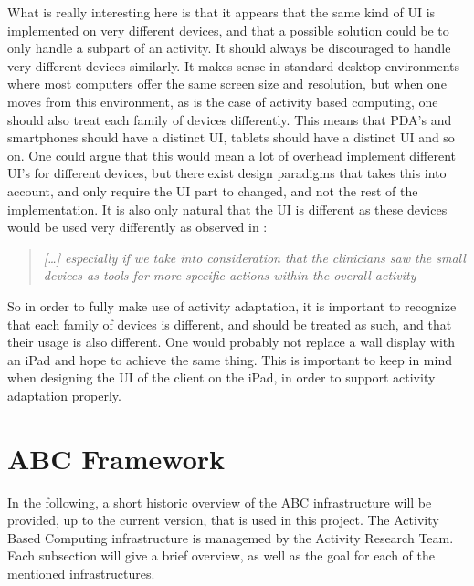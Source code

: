 What is really interesting here is that it appears that the same kind of UI is implemented on very different devices, and that a possible solution could be to only handle a subpart of an activity. It should always be discouraged to handle very different devices similarly. It makes sense in standard desktop environments where most computers offer the same screen size and resolution, but when one moves from this environment, as is the case of activity based computing, one should also treat each family of devices differently. This means that PDA's and smartphones should have a distinct UI, tablets should have a distinct UI and so on. One could argue that this would mean a lot of overhead implement different UI's for different devices, but there exist design paradigms that takes this into account, and only require the UI part to changed, and not the rest of the implementation. It is also only natural that the UI is different as these devices would be used very differently as observed in \citet{bardram2009}:

\begin{quotation}
	\emph{
		[\ldots] especially if we take into consideration that the clinicians saw the small devices as tools for more specific actions within the overall activity
	} 
\end{quotation}

So in order to fully make use of activity adaptation, it is important to recognize that each family of devices is different, and should be treated as such, and that their usage is also different. One would probably not replace a wall display with an iPad and hope to achieve the same thing. This is important to keep in mind when designing the UI of the client on the iPad, in order to support activity adaptation properly.

\section{ABC Framework}
In the following, a short historic overview of the ABC infrastructure will be provided, up to the current version, that is used in this project. The Activity Based Computing infrastructure is managemed by the Activity Research Team. Each subsection will give a brief overview, as well as the goal for each of the mentioned infrastructures.

